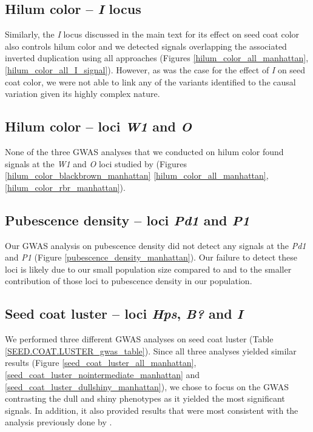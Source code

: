\documentclass[12pt]{report}
\begin{document}
\subsection*{Hilum color -- \textit{I} locus}
\label{annexe-sv-gwas-results-hilum-color-i}

Similarly, the \textit{I} locus discussed in the main text for its effect on seed coat
color also controls hilum color and we detected signals overlapping the
associated inverted duplication using all approaches (Figures
\ref{hilum_color_all_manhattan}, \ref{hilum_color_all_I_signal}). However,
as was the case for the effect of \textit{I} on seed coat color, we were
not able to link any of the variants identified to the causal variation given
its highly complex nature.

\subsection*{Hilum color -- loci \textit{W1} and \textit{O}}
\label{sv-gwas-hilum-color}

None of the three GWAS analyses that we conducted on hilum color found signals
at the \emph{W1} and \emph{O} loci studied by \cite{bandillo2017} (Figures
\ref{hilum_color_blackbrown_manhattan} \ref{hilum_color_all_manhattan},
\ref{hilum_color_rbr_manhattan}).

\subsection*{Pubescence density -- loci \textit{Pd1} and \textit{P1}}
\label{sv-gwas-pubescence-density}

Our GWAS analysis on pubescence density did not detect any signals at the
\emph{Pd1} and \emph{P1} (Figure \ref{pubescence_density_manhattan}). Our
failure to detect these loci is likely due to our small population size
compared to \cite{bandillo2017} and to the smaller contribution of those loci
to pubescence density in our population.

\subsection*{Seed coat luster -- loci \textit{Hps}, \textit{B?} and \textit{I}}
\label{sv-gwas-seed-coat-luster}

We performed three different GWAS analyses on seed coat luster (Table
\ref{SEED.COAT.LUSTER_gwas_table}). Since all three analyses yielded similar results
(Figure \ref{seed_coat_luster_all_manhattan},
\ref{seed_coat_luster_nointermediate_manhattan} and
\ref{seed_coat_luster_dullshiny_manhattan}), we chose to focus on the
GWAS contrasting the dull and shiny phenotypes as it yielded the most
significant signals. In addition, it also provided results that were most consistent with the
analysis previously done by \cite{bandillo2017}.
\end{document}
